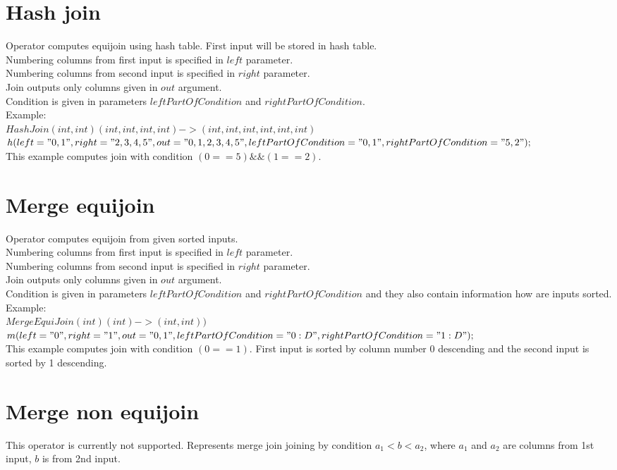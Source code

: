 \documentclass{article}
\begin{document}
\section{Hash join}
Operator computes equijoin using hash table. First input will be stored in hash table.\\
Numbering columns from first input is specified in $left$ parameter.\\
Numbering columns from second input is specified in $right$ parameter.\\
Join outputs only columns given in $out$ argument.\\
Condition is given in parameters $leftPartOfCondition$ and $rightPartOfCondition$.\\
Example:\\
$HashJoin(int,int)(int,int,int,int)->(int,int,int,int,int,int)$\\
$h(left="0,1",right="2,3,4,5",out="0,1,2,3,4,5",leftPartOfCondition="0,1",rightPartOfCondition="5,2");$\\ 
This example computes join with condition $(0==5) \&\& (1==2)$.

\section{Merge equijoin}
Operator computes equijoin from given sorted inputs.\\
Numbering columns from first input is specified in $left$ parameter.\\
Numbering columns from second input is specified in $right$ parameter.\\
Join outputs only columns given in $out$ argument.\\
Condition is given in parameters $leftPartOfCondition$ and $rightPartOfCondition$ and they also contain information how are inputs sorted.\\
Example:\\
$MergeEquiJoin(int)(int)->(int,int))$\\
$m(left="0",right="1",out="0,1",leftPartOfCondition="0:D",rightPartOfCondition="1:D");$\\ 
This example computes join with condition $(0==1)$. First input is sorted by column number 0 descending and the second input is sorted by 1 descending.

\section{Merge non equijoin}
This operator is currently not supported. Represents merge join joining by condition $a_1<b<a_2$, where $a_1$ and $a_2$ are columns from 1st input, $b$ is from 2nd input. 
\end{document}

